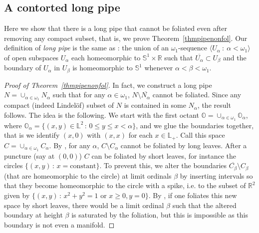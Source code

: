 \documentclass{amsart}
\begin{document}
\subsection{A contorted long pipe}\label{ContortedPipe}

Here we show that there is a long pipe that cannot be foliated even after removing any compact subset, that is, we prove Theorem~\ref{thmpipenonfol}. Our definition of \emph{long pipe} is the same as \cite[5.2]{Nyikos84}: the union of an $\omega_1$-sequence $\langle U_\alpha\ :\ \alpha<\omega_1\rangle$ of open subspaces $U_\alpha$ each homeomorphic to $\mathbb S^1\times{\mathbb R}$ such that $\overline{U_\alpha}\subset U_\beta$ and the boundary of $U_\alpha$ in $U_\beta$ is homeomorphic to $\mathbb S^1$ whenever $\alpha<\beta<\omega_1$.

\begin{proof}[Proof of Theorem~\ref{thmpipenonfol}]
In fact, we construct a long pipe $N=\cup_{\alpha\in\omega_1}N_\alpha$ such that for any $\alpha\in\omega_1$, $N\setminus{\overline{{N_\alpha}}}$ cannot be foliated.  Since any compact (indeed Lindel\"of) subset of $N$ is contained in some $N_\alpha$, the result follows. The idea is the following. We start with the first octant ${\mathbb{O}}=\cup_{\alpha\in\omega_1}{\mathbb{O}}_\alpha$, where
${\mathbb{O}}_\alpha=\{(x,y)\in{\mathbb{L}}^2\,:\, 0\le y\le x<\alpha\}$, and we glue the boundaries together, that is we identify $(x,0)$ with $(x,x)$ for each $x\in\mathbb L_+$. Call this space $C=\cup_{\alpha\in\omega_1}C_\alpha$. By \cite[Proposition~6.1]{BGG}, for any $\alpha$, $C\setminus C_\alpha$ cannot be foliated by long leaves. After a puncture (say at $(0,0)$) $C$ can be foliated by short leaves, for instance the circles $\{(x,y)\,:\, x= \mbox{constant}\}$. To prevent this, we alter the boundaries $\overline{C_\beta}\setminus C_\beta$ (that are homeomorphic to the circle) at limit ordinals $\beta$ by inserting intervals so that they become homeomorphic to the circle with a spike, i.e. to the subset of $\mathbb R^2$ given by $\{(x,y)\,:\,x^2+y^2=1\mbox{ or } x\ge 0, y=0\}$. By \cite[Proposition~4.2]{BGG}, if one foliates this new space by short leaves, there would be a limit ordinal $\beta$ such that the altered boundary at height $\beta$ is saturated by the foliation, but this is impossible as this boundary is not even a manifold.


\end{proof}
\end{document}
